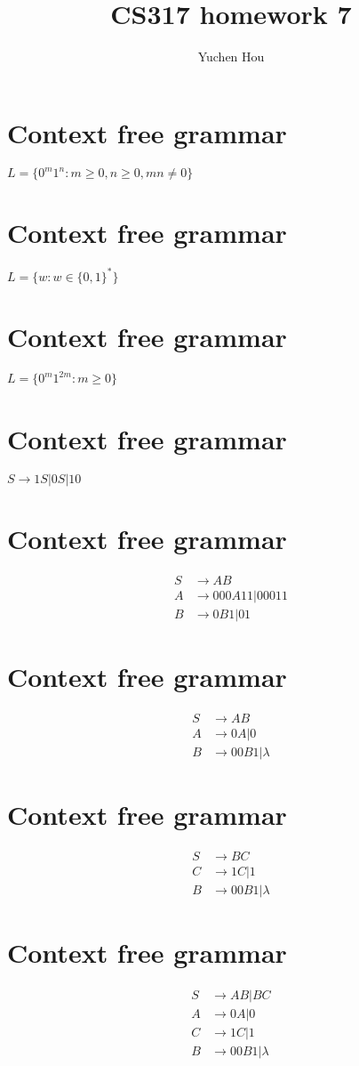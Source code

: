 \documentclass{article}
\begin{document}
\lstset{language=Java}
\title{CS317 homework 7}
\author{Yuchen Hou}
\maketitle
\section{Context free grammar}
$L = \{0^m1^n: m \geq 0, n \geq 0, mn \neq 0\}$
\section{Context free grammar}
$L = \{w: w \in \{0, 1\}^* \}$
\section{Context free grammar}
$L = \{0^m1^{2m}: m \geq 0\}$
\section{Context free grammar}
$S \to 1S | 0S |10$
\section{Context free grammar}
\begin{align*}
S &\to AB\\
A &\to 000A11 | 00011\\
B &\to 0B1 | 01
\end{align*}
\section{Context free grammar}
\begin{align*}
S &\to AB\\
A &\to 0A | 0\\
B &\to 00B1 | \lambda
\end{align*}
\section{Context free grammar}
\begin{align*}
S &\to BC\\
C &\to 1C | 1\\
B &\to 00B1 | \lambda
\end{align*}
\section{Context free grammar}
\begin{align*}
S &\to AB | BC\\
A &\to 0A | 0\\
C &\to 1C | 1\\
B &\to 00B1 | \lambda
\end{align*}
\end{document}
